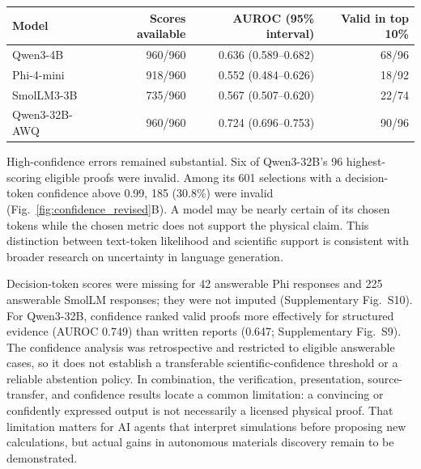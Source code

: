 \begin{center}
\begin{minipage}{\linewidth}
\centering\small
{}
\label{tab:confidence}
\begin{tabular}{lrrr}
\toprule
Model & Scores available & AUROC (95\% interval) & Valid in top 10\%\\
\midrule
Qwen3-4B & 960/960 & 0.636 (0.589--0.682) & 68/96\\
Phi-4-mini & 918/960 & 0.552 (0.484--0.626) & 18/92\\
SmolLM3-3B & 735/960 & 0.567 (0.507--0.620) & 22/74\\
Qwen3-32B-AWQ & 960/960 & 0.724 (0.696--0.753) & 90/96\\
\bottomrule
\end{tabular}
\end{minipage}
\end{center}

High-confidence errors remained substantial. Six of Qwen3-32B's 96 highest-scoring eligible proofs were invalid. Among its 601 selections with a decision-token confidence above 0.99, 185 (30.8\%) were invalid (Fig.~\ref{fig:confidence_revised}B). A model may be nearly certain of its chosen tokens while the chosen metric does not support the physical claim. This distinction between text-token likelihood and scientific support is consistent with broader research on uncertainty in language generation.\cite{farquhar2024semantic,zheng2026sciverifier}

Decision-token scores were missing for 42 answerable Phi responses and 225 answerable SmolLM responses; they were not imputed (Supplementary Fig.~S10). For Qwen3-32B, confidence ranked valid proofs more effectively for structured evidence (AUROC 0.749) than written reports (0.647; Supplementary Fig.~S9). The confidence analysis was retrospective and restricted to eligible answerable cases, so it does not establish a transferable scientific-confidence threshold or a reliable abstention policy. In combination, the verification, presentation, source-transfer, and confidence results locate a common limitation: a convincing or confidently expressed output is not necessarily a licensed physical proof. That limitation matters for AI agents that interpret simulations before proposing new calculations, but actual gains in autonomous materials discovery remain to be demonstrated.
